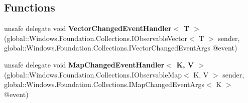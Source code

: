 \subsection*{Functions}
\begin{DoxyCompactItemize}
\item 
\mbox{\label{namespace_windows_1_1_foundation_1_1_collections_a220a35beb91f50af19337256572be3a6}} 
unsafe delegate void {\bfseries Vector\+Changed\+Event\+Handler$<$ T $>$} (global\+::\+Windows.\+Foundation.\+Collections.\+I\+Observable\+Vector$<$ T $>$ sender, global\+::\+Windows.\+Foundation.\+Collections.\+I\+Vector\+Changed\+Event\+Args @event)
\item 
\mbox{\label{namespace_windows_1_1_foundation_1_1_collections_ab9e362e8a9ee092bedca636e4eae2a77}} 
unsafe delegate void {\bfseries Map\+Changed\+Event\+Handler$<$ K, V $>$} (global\+::\+Windows.\+Foundation.\+Collections.\+I\+Observable\+Map$<$ K, V $>$ sender, global\+::\+Windows.\+Foundation.\+Collections.\+I\+Map\+Changed\+Event\+Args$<$ K $>$ @event)
\end{DoxyCompactItemize}
